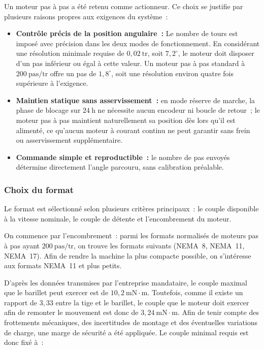 Un moteur pas à pas a été retenu comme actionneur. Ce choix se justifie par
plusieurs raisons propres aux exigences du système~:

\begin{itemize}
    \setlength{\itemsep}{6pt}
    \item \textbf{Contrôle précis de la position angulaire~:} Le nombre de tours est imposé avec
        précision dans les deux modes de fonctionnement. En considérant une résolution minimale requise de
        $0{,}02\ \mathrm{tr}$, soit $7{,}2^\circ$, le moteur doit disposer
        d'un pas inférieur ou égal à cette valeur. Un moteur pas à pas standard
        à $200\ \mathrm{pas/tr}$ offre un pas de $1{,}8^\circ$, soit une
        résolution environ quatre fois supérieure à l'exigence.
    \item \textbf{Maintien statique sans asservissement~:} en mode réserve de
        marche, la phase de blocage sur $24\ \mathrm{h}$ ne nécessite aucun
        encodeur ni boucle de retour~; le moteur pas à pas maintient
        naturellement sa position dès lors qu'il est alimenté, ce qu'aucun
        moteur à courant continu ne peut garantir sans frein ou asservissement
        supplémentaire.
    \item \textbf{Commande simple et reproductible~:} le nombre de pas envoyés
        détermine directement l'angle parcouru, sans calibration préalable.
\end{itemize}

\newpage
\subsubsection{Choix du format}

Le format est sélectionné selon plusieurs critères principaux~: le couple disponible
à la vitesse nominale, le couple de détente et l'encombrement du moteur.

On commence par l'encombrement~: parmi les formats normalisés de moteurs pas à pas
ayant $200\ \mathrm{pas/tr}$, on trouve les formats suivants (NEMA~8, NEMA~11,
NEMA~17). Afin de rendre la machine la plus compacte possible, on s'intéresse aux
formats NEMA~11 et plus petits.

D'après les données transmises par l'entreprise mandataire, le couple maximal
que le barillet peut exercer est de $10{,}2\ \mathrm{mN{\cdot}m}$. Toutefois,
comme il existe un rapport de $3{,}33$ entre la tige et le barillet, le couple
que le moteur doit exercer afin de remonter le mouvement est donc de
$3{,}24\ \mathrm{mN{\cdot}m}$. Afin de tenir compte des frottements mécaniques,
des incertitudes de montage et des éventuelles variations de charge, une marge
de sécurité a été appliquée.
Le couple minimal requis est donc fixé à~:

